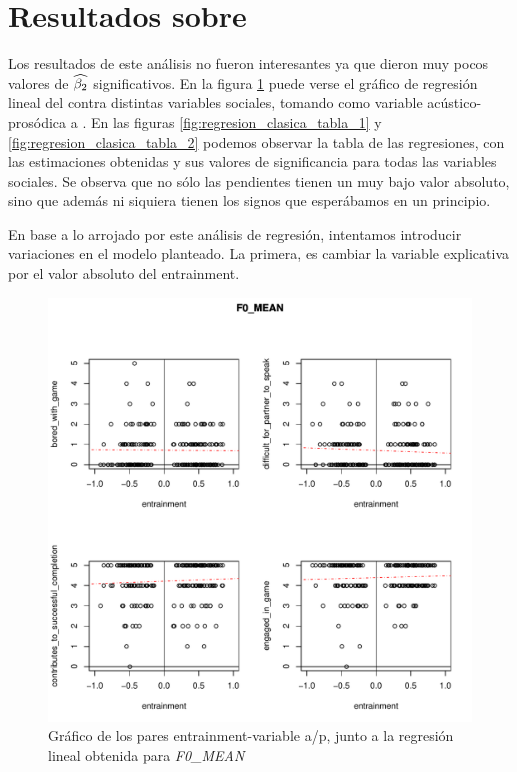 \section{Resultados sobre \entrainment}

Los resultados de este análisis no fueron interesantes ya que dieron muy pocos valores de $\widehat{\beta_2}$ significativos. En la figura \ref{fig:regresion_clasica} puede verse el gráfico de regresión lineal del \entrainment contra distintas variables sociales, tomando como variable acústico-prosódica a \FOMEAN. En las figuras \ref{fig:regresion_clasica_tabla_1} y \ref{fig:regresion_clasica_tabla_2} podemos observar la tabla de las regresiones, con las estimaciones obtenidas y sus valores de significancia para todas las variables sociales. Se observa que no sólo las pendientes tienen un muy bajo valor absoluto, sino que además ni siquiera tienen los signos que esperábamos en un principio.

En base a lo arrojado por este análisis de regresión, intentamos introducir variaciones en el modelo planteado. La primera, es cambiar la variable explicativa por el valor absoluto del entrainment.


\begin{figure}[t!]
\includegraphics[width=15cm]{images/regression_F0_MEAN_1.pdf}
\caption{Gráfico de los pares entrainment-variable a/p, junto a la regresión lineal obtenida para \emph{F0\_MEAN}}
\label{fig:regresion_clasica}
\end{figure}


